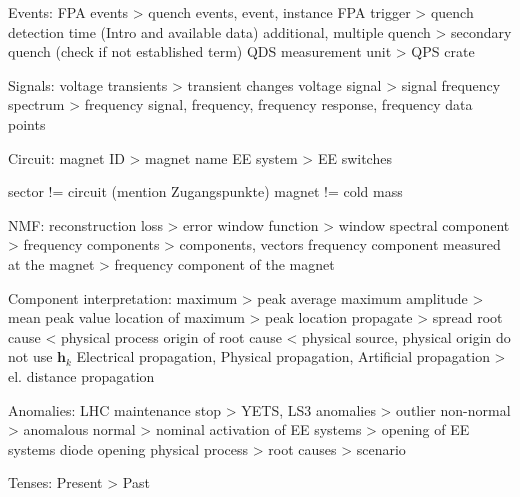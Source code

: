 Events:
FPA events > quench events, event, instance
FPA trigger > quench detection time (Intro and available data)
additional, multiple quench > secondary quench (check if not established term)
QDS measurement unit > QPS crate 

Signals:
voltage transients > transient changes
voltage signal > signal
frequency spectrum > frequency signal, frequency, frequency response, frequency data points

Circuit:
magnet ID > magnet name
EE system > EE switches

sector != circuit (mention Zugangspunkte)
magnet != cold mass

NMF:
reconstruction loss > error
window function > window
spectral component > frequency components > components, vectors
frequency component measured at the magnet > frequency component of the magnet

Component interpretation:
maximum > peak
average maximum amplitude > mean peak value
location of maximum > peak location
propagate > spread
root cause < physical process
origin of root cause < physical source, physical origin
do not use $\mathbf{h}_k$
Electrical propagation, Physical propagation, Artificial propagation > el. distance propagation %

Anomalies:
LHC maintenance stop > YETS, LS3
anomalies > outlier
non-normal > anomalous 
normal > nominal
activation of EE systems > opening of EE systems
diode opening
physical process > root causes > scenario


Tenses: %
Present > Past

